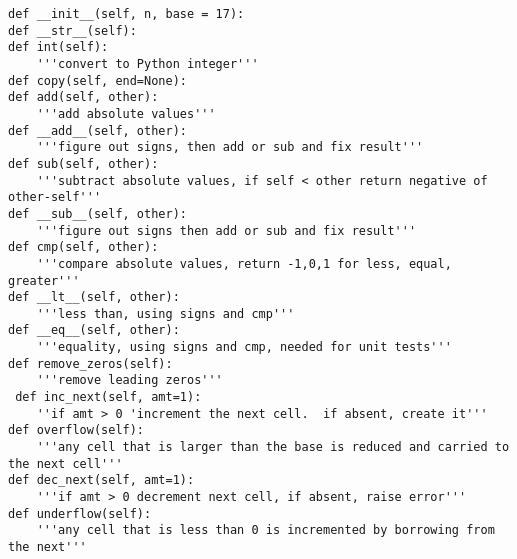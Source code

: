 \documentclass{article}
\begin{document}
\begin{description}
\begin{lstlisting}
def __init__(self, n, base = 17):
def __str__(self):
def int(self):
    '''convert to Python integer'''
def copy(self, end=None):
def add(self, other):
    '''add absolute values'''
def __add__(self, other):
    '''figure out signs, then add or sub and fix result'''
def sub(self, other):
    '''subtract absolute values, if self < other return negative of other-self'''
def __sub__(self, other):
    '''figure out signs then add or sub and fix result'''
def cmp(self, other):
    '''compare absolute values, return -1,0,1 for less, equal, greater'''        
def __lt__(self, other):
    '''less than, using signs and cmp'''
def __eq__(self, other):
    '''equality, using signs and cmp, needed for unit tests'''
def remove_zeros(self):
    '''remove leading zeros'''               
 def inc_next(self, amt=1):
    ''if amt > 0 'increment the next cell.  if absent, create it'''
def overflow(self):
    '''any cell that is larger than the base is reduced and carried to the next cell''' 
def dec_next(self, amt=1):
    '''if amt > 0 decrement next cell, if absent, raise error'''            
def underflow(self):
    '''any cell that is less than 0 is incremented by borrowing from the next'''
\end{lstlisting}
\end{description}
\end{document}
